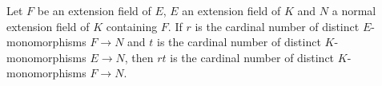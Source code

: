 Let $F$ be an extension field of $E$, $E$ an extension field of $K$ and $N$ a normal extension field of $K$ containing $F$. If $r$ is the cardinal number of distinct $E$-monomorphisms $F \to N$ and $t$ is the cardinal number of distinct $K$-monomorphisms $E \to N$, then $rt$ is the cardinal number of distinct $K$-monomorphisms $F \to N$.

